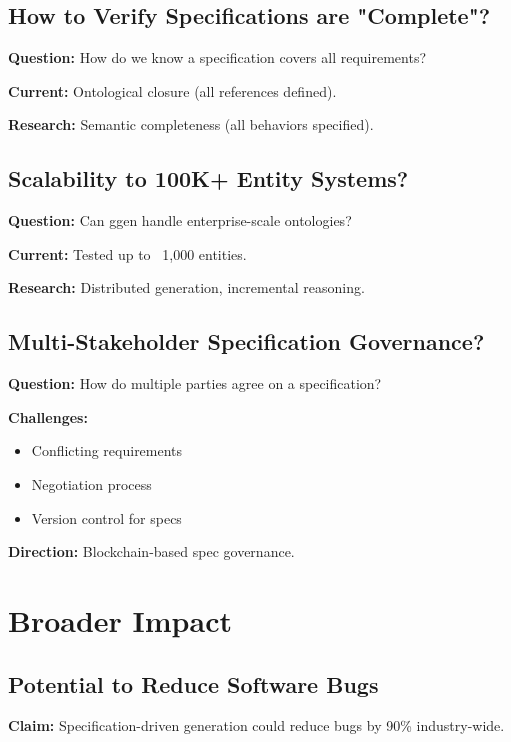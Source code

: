 \subsection{How to Verify Specifications are "Complete"?}

\textbf{Question:} How do we know a specification covers all requirements?

\textbf{Current:} Ontological closure (all references defined).

\textbf{Research:} Semantic completeness (all behaviors specified).

\subsection{Scalability to 100K+ Entity Systems?}

\textbf{Question:} Can ggen handle enterprise-scale ontologies?

\textbf{Current:} Tested up to ~1,000 entities.

\textbf{Research:} Distributed generation, incremental reasoning.

\subsection{Multi-Stakeholder Specification Governance?}

\textbf{Question:} How do multiple parties agree on a specification?

\textbf{Challenges:}
\begin{itemize}
    \item Conflicting requirements
    \item Negotiation process
    \item Version control for specs
\end{itemize}

\textbf{Direction:} Blockchain-based spec governance.

\section{Broader Impact}

\subsection{Potential to Reduce Software Bugs}

\textbf{Claim:} Specification-driven generation could reduce bugs by 90\% industry-wide.

